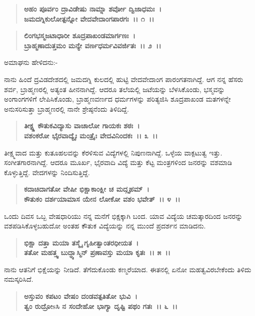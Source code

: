 \begin{verse}
\textbf{ಅಹಂ ಪೂರ್ವಂ ದ್ರಾವಿಡೇಷು ನಾಮ್ನಾ ಶರ್ವೋ ದ್ವಿಜಾಧಮಃ~।}\\\textbf{ಜಮದಗ್ನಿಕುಲೋತ್ಪನ್ನೋ ವೇದವೇದಾಂಗಪಾರಗಃ~।। ೧~।।} 
\end{verse}

\begin{verse}
\textbf{ಲಿಂಗಭಸ್ಮಜಟಾಧಾರೀ ಶೂದ್ರಪಾಖಂಡಮಾರ್ಗಣಃ~।}\\\textbf{ಬ್ರಾಹ್ಮಣಾದುತ್ತಮಂ ಮನ್ಯೇ ವರ್ಣಧರ್ಮವಿವರ್ಜಿತಃ~।। ೨~।।}
\end{verse}

\begin{flushleft}
ಅಮಾಘನು ಹೇಳಿದನು:-
\end{flushleft}

ನಾನು ಹಿಂದೆ ದ್ರವಿಡದೇಶದಲ್ಲಿ ಜಮದಗ್ನಿ ಕುಲದಲ್ಲಿ ಹುಟ್ಟಿ ವೇದವೇದಾಂಗ ಪಾರಂಗತನಾಗಿದ್ದೆ. ಆಗ ನನ್ನ ಹೆಸರು ಶರ್ವ, ಬ್ರಾಹ್ಮಣರಲ್ಲಿ ಅತ್ಯಂತ ಹೀನನಾಗಿದ್ದೆ. ಆದರೂ ತಲೆಯಲ್ಲಿ ಜಟೆಯನ್ನು ಬೆಳಸಿಕೊಂಡು, ಭಸ್ಮವನ್ನು ಅಂಗಾಂಗಗಳಿಗೆ ಲೇಪಿಸಿಕೊಂಡು, ಬ್ರಾಹ್ಮಣವರ್ಣದ ಧರ್ಮಗಳನ್ನು ಪರಿತ್ಯಜಿಸಿ ಶೂದ್ರಪಾಖಂಡ ಮತಗಳನ್ನೇ ಅನುಸರಿಸುತ್ತಾ ಬ್ರಾಹ್ಮಣರಲ್ಲಿ ನಾನೇ ಶ್ರೇಷ್ಠನೆಂದು ತಿಳಿದಿದ್ದೆ.

\begin{verse}
\textbf{ತೀಕ್ಷ್ಣ ಕೌತುಕವಿದ್ಯಾಸು ವಾಚಾಲೋ ಗಾಯಕಃ ಶಠಃ~।}\\\textbf{ವಶಂಕರೋ ಭೈರವಾದ್ಯೈಃ ಮಂತ್ರೈಃ ವೇದವಿನಿಂದಕಃ~।। ೩~।।}
\end{verse}

ತೀಕ್ಷ್ಮವಾದ ಮತ್ತು ಕುತೂಹಲವನ್ನು ಕೆರಳಿಸುವ ವಿದ್ಯೆಗಳಲ್ಲಿ ನಿಪುಣನಾಗಿದ್ದೆ. ಒಳ್ಳೆಯ ವಾಕ್ಪಟುತ್ವ ಇತ್ತು. ಸಂಗೀತಗಾರನಾಗಿದ್ದೆ. ಆದರೂ ಮೂರ್ಖ, ಭೈರವಾದಿ ವಿದ್ಯೆ ಮತ್ತು ಕೆಟ್ಟ ಮಂತ್ರಗಳಿಂದ ಜನರನ್ನು ವಶಮಾಡಿ ಕೊಳ್ಳುತ್ತಿದ್ದೆ. ವೇದಗಳನ್ನು ನಿಂದಿಸುತ್ತಿದ್ದೆ.

\begin{verse}
\textbf{ಕದಾಚಿದಾಗತೋ ವೇಷೀ ಭಿಕ್ಷಾಕಾಂಕ್ಷೀ ಚ ಮದ್ಗೃಹಮ್~।}\\\textbf{ಕೌತುಕಂ ದರ್ಶಯಾಮಾಸ ಯೇನ ಲೋಕೋ ವಶಂ ಭವೇತ್~।। ೪~।।}
\end{verse}

ಒಂದು ದಿವಸ ಒಬ್ಬ ವೇಷಧಾರಿಯು ನನ್ನ ಮನೆಗೆ ಭಿಕ್ಷಕ್ಕಾಗಿ ಬಂದ. ಯಾವ ವಿದ್ಯೆಯ ಚಮತ್ಕಾರದಿಂದ ಜನರನ್ನು ವಶಪಡಿಸಿಕೊಳ್ಳಬಹುದೋ ಅಂತಹ ಕೌತುಕ ವಿದ್ಯೆಯನ್ನು ನನ್ನ ಮುಂದೆ ಪ್ರದರ್ಶನ ಮಾಡಿದನು.

\begin{verse}
\textbf{ಭಿಕ್ಷಾ ದತ್ತಾ ಮಯಾ ತಸ್ಮೈ ಗೃಹೀತ್ವಾಂತರಧೀಯತ~।}\\\textbf{ತತೋ ಮಹತ್ತ್ವ ಬುದ್ಧ್ಯಾಸ್ಮಿನ್ ಪ್ರಣಾವಸ್ತು ಮಯಾ ಕೃತಃ~।। ೫~।।}
\end{verse}

ನಾನು ಆತನಿಗೆ ಭಿಕ್ಷೆಯನ್ನು ನೀಡಿದೆ. ತೆಗೆದುಕೊಂಡು ಕಣ್ಮರೆಯಾದ. ಈತನಲ್ಲಿ ಏನೋ ಮಹತ್ವವಿರಬೇಕೆಂದು ತಿಳಿದು ನಮಸ್ಕರಿಸಿದೆ.

\begin{verse}
\textbf{ಅಸ್ತುವಂ ಕಪಟಂ ವೇಷಂ ದಂಡವತ್ಪತಿತೋ ಭುವಿ~।}\\\textbf{ತ್ವಂ ರುದ್ರೋsಸಿ ನ ಸಂದೇಹೋ ಭಾಗ್ಯಾ ದೃಷ್ಟಿ ಪಥಂ ಗತಃ~।। ೬~।।}
\end{verse}

